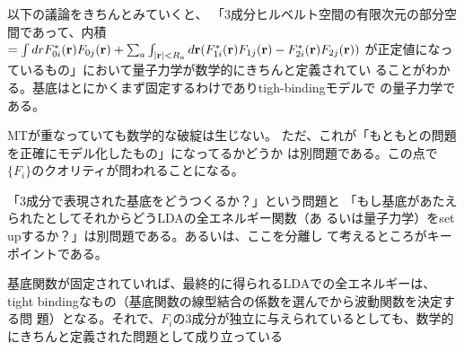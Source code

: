 \documentclass[a4paper,10pt,aip,onecolumn,amsmath,amssymb,floatfix,rmp]{revtex4-1}
\newcommand{\bfr}{{\bf r}}
\begin{document}




以下の議論をきちんとみていくと、
「3成分ヒルベルト空間の有限次元の部分空間であって、内積
$= \int dr F^*_{0i}(\bfr) F_{0j}(\bfr)  
+ \sum_a \int_{|\bfr| <R_a} d\bfr (F^{*}_{1i}(\bfr) F_{1j}(\bfr) -F^{*}_{2i}(\bfr) F_{2j}(\bfr))$
が正定値になっているもの」において量子力学が数学的にきちんと定義されてい
ることがわかる。基底はとにかくまず固定するわけでありtigh-bindingモデルで
の量子力学である。

MTが重なっていても数学的な破綻は生じない。
ただ、これが「もともとの問題を正確にモデル化したもの」になってるかどうか
は別問題である。この点で$\{ F_i \}$のクオリティが問われることになる。

「3成分で表現された基底をどうつくるか？」という問題と
「もし基底があたえられたとしてそれからどうLDAの全エネルギー関数（あ
るいは量子力学）をset upするか？」は別問題である。あるいは、ここを分離し
て考えるところがキーポイントである。

基底関数が固定されていれば、最終的に得られるLDAでの全エネルギーは、tight
bindingなもの（基底関数の線型結合の係数を選んでから波動関数を決定する問
題）となる。それで、$F_{i}$の3成分が独立に与えられているとしても、数学的
にきちんと定義された問題として成り立っている
%


\end{document}
